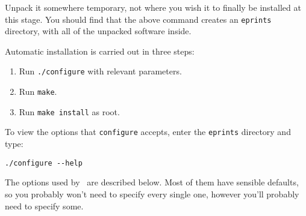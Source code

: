 Unpack it somewhere temporary, not where you wish it to finally be installed at this stage. You should find that the above command creates an {\tt eprints} directory, with all of the unpacked software inside.

Automatic installation is carried out in three steps:

\begin{enumerate}
\item Run {\tt ./configure} with relevant parameters.
\item Run {\tt make}.
\item Run {\tt make install} as root.
\end{enumerate}

To view the options that {\tt configure} accepts, enter the {\tt eprints} directory and type:

\begin{verbatim}
./configure --help
\end{verbatim}

The options used by \eprints\ are described below. Most of them have sensible defaults, so you probably won't need to specify every single one, however you'll probably need to specify some.

